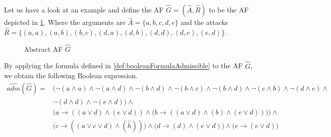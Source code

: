 \begin{example}
    Let us have a look at an example and define the AF $\hat{G}=(\hat{A},\hat{R})$ to be the AF depicted in \cref{af:algorithmEncodingsAdmissible}. Where the arguments are $\hat{A}=\{a, b, c, d, e\}$ and the attacks $\hat{R}=\big\{ (a,a), (a,b), (b,c), (d,a), (d,b), (d,d), (d, e), (e, d)\big\}$.

    \begin{figure}[H]
        \centering
        \caption{Abstract AF $\hat{G}$}
        \label{af:algorithmEncodingsAdmissible}
    \end{figure}

By applying the formula defined in \cref{def:booleanFormulaAdmissible} to the AF $\hat{G}$, we obtain the following Boolean expression.
\begin{align*}
    \hat{adm}(\hat{G}) = &\big(
     \lnot (a \land a) \land \lnot (a \land d) \land \lnot (b \land d) \land \lnot (b \land c) \land \lnot (b \land d) \land \lnot (c \land b) \land \lnot (d \land e) \land \\
      & \lnot (d \land d) \land \lnot (e \land d) \big) \land\\
      &\bigl( a \rightarrow ((a \lor d) \land (e \lor d)) \land \bigl( b \rightarrow ((a \lor d) \land (b) \land (e \lor d)) \bigl) \bigl) \land\\
      &\bigl( c \rightarrow ((a \lor c \lor d) \land (\hat{h})) \bigl) \land \bigl( d \rightarrow (d) \land (e \lor d) \bigl) \land \bigl( e \rightarrow (e \lor d) \bigl)
\end{align*}


\end{example}
